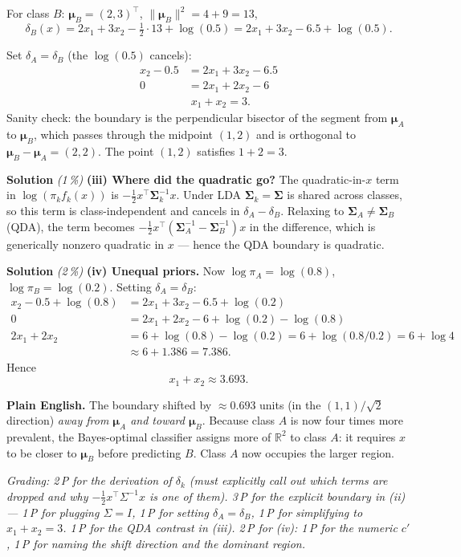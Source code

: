 \documentclass[11pt,a4paper]{article}
\newcommand{\subpoints}[1]{\textit{(#1\,\%)}}
\newcommand{\sol}{\noindent\textbf{Solution}}
\begin{document}
For class $B$: $\bm\mu_B = (2,3)^\top$, $\|\bm\mu_B\|^2 = 4 + 9 = 13$,
$$\delta_B(x) = 2x_1 + 3x_2 - \tfrac{1}{2}\cdot 13 + \log(0.5) = 2x_1 + 3x_2 - 6.5 + \log(0.5).$$

Set $\delta_A = \delta_B$ (the $\log(0.5)$ cancels):
\begin{align*}
x_2 - 0.5 &= 2x_1 + 3x_2 - 6.5 \\
0 &= 2x_1 + 2x_2 - 6 \\
&\boxed{\;x_1 + x_2 = 3.\;}
\end{align*}
Sanity check: the boundary is the perpendicular bisector of the segment from $\bm\mu_A$ to
$\bm\mu_B$, which passes through the midpoint $(1,2)$ and is orthogonal to
$\bm\mu_B - \bm\mu_A = (2,2)$. The point $(1,2)$ satisfies $1+2=3$. \checkmark

\medskip
\sol{} \subpoints{1} \textbf{(iii) Where did the quadratic go?} The quadratic-in-$x$ term in
$\log(\pi_k f_k(x))$ is $-\tfrac{1}{2}x^\top\bm\Sigma_k^{-1}x$. Under LDA $\bm\Sigma_k = \bm\Sigma$
is shared across classes, so this term is class-independent and cancels in $\delta_A - \delta_B$.
Relaxing to $\bm\Sigma_A \neq \bm\Sigma_B$ (QDA), the term becomes
$-\tfrac{1}{2}x^\top(\bm\Sigma_A^{-1} - \bm\Sigma_B^{-1})x$ in the difference, which is generically
nonzero quadratic in $x$ --- hence the QDA boundary is quadratic.

\medskip
\sol{} \subpoints{2} \textbf{(iv) Unequal priors.} Now $\log\pi_A = \log(0.8)$, $\log\pi_B = \log(0.2)$.
Setting $\delta_A = \delta_B$:
\begin{align*}
x_2 - 0.5 + \log(0.8) &= 2x_1 + 3x_2 - 6.5 + \log(0.2) \\
0 &= 2x_1 + 2x_2 - 6 + \log(0.2) - \log(0.8) \\
2x_1 + 2x_2 &= 6 + \log(0.8) - \log(0.2) = 6 + \log(0.8/0.2) = 6 + \log 4 \\
&\approx 6 + 1.386 = 7.386.
\end{align*}
Hence
$$\boxed{\;x_1 + x_2 \approx 3.693.\;}$$

\textbf{Plain English.} The boundary shifted by $\approx 0.693$ units (in the $(1,1)/\sqrt 2$
direction) \emph{away from $\bm\mu_A$ and toward $\bm\mu_B$}. Because class $A$ is now four times
more prevalent, the Bayes-optimal classifier assigns more of $\mathbb R^2$ to class $A$: it requires
$x$ to be closer to $\bm\mu_B$ before predicting $B$. Class $A$ now occupies the larger region.

\noindent\emph{Grading: 2\,P for the derivation of $\delta_k$ (must explicitly call out which terms
are dropped and why $-\tfrac{1}{2}x^\top\Sigma^{-1}x$ is one of them). 3\,P for the explicit boundary
in (ii) --- 1\,P for plugging $\Sigma=I$, 1\,P for setting $\delta_A=\delta_B$, 1\,P for simplifying
to $x_1+x_2=3$. 1\,P for the QDA contrast in (iii). 2\,P for (iv): 1\,P for the numeric $c'$, 1\,P
for naming the shift direction and the dominant region.}
\end{document}

